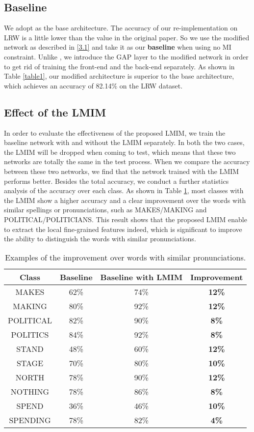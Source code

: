 \documentclass[a4paper, 10pt, conference]{ieeeconf}      \usepackage{FG2020}
\begin{document}
\subsection{Baseline}
We adopt \cite{petridis2018end} as the base architecture. The accuracy of our re-implementation on LRW is a little lower than the value in the original paper. So we use the modified network as described in \ref{3.1} and take it as our \textbf{baseline} when using no MI constraint. Unlike \cite{petridis2018end}, we introduce the GAP layer to the modified network in order to get rid of training the front-end and the back-end separately. As shown in Table \ref{table1}, our modified architecture is superior to the base architecture, which achieves an accuracy of 82.14\% on the LRW dataset.
\subsection{Effect of the LMIM}\label{effort_LMIM}
In order to evaluate the effectiveness of the proposed LMIM, we train the baseline network with and without the LMIM separately. In both the two cases, the LMIM will be dropped when coming to test, which means that these two networks are totally the same in the test process. When we compare the accuracy between these two networks, we find that the network trained with the LMIM performs better. Besides the total accuracy, we conduct a further statistics analysis of the accuracy over each class. As shown in Table \ref{table_add1},  most classes with the LMIM show a higher accuracy and a clear improvement over the words with similar spellings or pronunciations, such as MAKES/MAKING and POLITICAL/POLITICIANS. This result shows that the proposed LMIM enable to extract the local fine-grained features indeed, which is significant to improve the ability to distinguish the words with similar pronunciations.
\begin{table}[t]
\caption{Examples of the improvement over words with similar pronunciations.}
\label{table_add1}
\begin{center}
\begin{tabular}{|c|c|c|c|}
\hline
Class & Baseline & Baseline with LMIM &  Improvement\\
\hline
\hline
MAKES & 62\% & 74\% & \textbf{12\%}\\
\hline
MAKING & 80\% & 92\% & \textbf{12\%}\\
\hline
\hline
POLITICAL & 82\% & 90\% & \textbf{8\%}\\
\hline
POLITICS & 84\% & 92\% & \textbf{8\%}\\
\hline
\hline
STAND & 48\% & 60\% & \textbf{12\%}\\
\hline
STAGE & 70\% & 80\% & \textbf{10\%}\\
\hline
\hline
NORTH & 78\% & 90\% & \textbf{12\%}\\
\hline
NOTHING & 78\% & 86\% & \textbf{8\%}\\
\hline
\hline
SPEND & 36\% & 46\% & \textbf{10\%}\\
\hline
SPENDING & 78\% & 82\% & \textbf{4\%}\\
\hline

\end{tabular}
\end{center}
\end{table}
\end{document}
